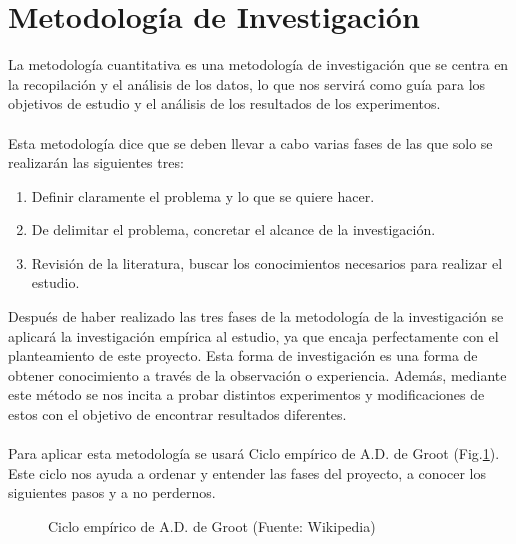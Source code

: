 \section{Metodología de Investigación}
La metodología cuantitativa es una metodología de investigación que se centra en la recopilación y el análisis de los datos, lo que nos servirá como guía para los objetivos de estudio y el análisis de los resultados de los experimentos. 
\\ \\
Esta metodología dice que se deben llevar a cabo varias fases de las que solo se realizarán las siguientes tres:
\begin{enumerate}
    \item Definir claramente el problema y lo que se quiere hacer. 
    \item De delimitar el problema, concretar el alcance de la investigación.
    \item Revisión de la literatura, buscar los conocimientos necesarios para realizar el estudio.
\end{enumerate}
Después de haber realizado las tres fases de la metodología de la investigación se aplicará la investigación empírica al estudio, ya que encaja perfectamente con el planteamiento de este proyecto. Esta forma de investigación es una forma de obtener conocimiento a través de la observación o experiencia. Además, mediante este método se nos incita a probar distintos experimentos y modificaciones de estos con el objetivo de encontrar resultados diferentes.\\ \\
Para aplicar esta metodología se usará Ciclo empírico de A.D. de Groot (Fig.\ref{fig:CicloEmpirico}). Este ciclo nos ayuda a ordenar y entender las fases del proyecto, a conocer los siguientes pasos y a no perdernos.
\begin{figure}[thbp]
    \centering
    \caption{Ciclo empírico de A.D. de Groot (Fuente: Wikipedia\autocite{InvestigacionEmpirica2020})} 
    \label{fig:CicloEmpirico}
\end{figure}

